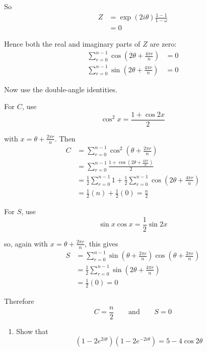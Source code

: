 \documentclass[leqno]{article}
\begin{document}
\begin{enumerate}[
  label=\textbf{\arabic*.},
  leftmargin=*,
  topsep=0pt,
  partopsep=0pt,
  parsep=0pt
]
\begin{djsSolution}
So
\begin{align*}
Z
&=\exp(2i\theta)\frac{1-1}{1-\omega} \\
&=0
\end{align*}

Hence both the real and imaginary parts of \(Z\) are zero:
\begin{align*}
\sum_{r=0}^{n-1}\cos\left(2\theta+\frac{4\pi r}{n}\right)&=0 \\
\sum_{r=0}^{n-1}\sin\left(2\theta+\frac{4\pi r}{n}\right)&=0
\end{align*}

Now use the double-angle identities.

For \(C\), use
\[
\cos^2 x=\frac{1+\cos 2x}{2}
\]

with \(x=\theta+\frac{2\pi r}{n}\). Then
\begin{align*}
C
&=\sum_{r=0}^{n-1}\cos^2\left(\theta+\frac{2\pi r}{n}\right) \\
&=\sum_{r=0}^{n-1}\frac{1+\cos\left(2\theta+\frac{4\pi r}{n}\right)}{2} \\
&=\frac12\sum_{r=0}^{n-1}1+\frac12\sum_{r=0}^{n-1}\cos\left(2\theta+\frac{4\pi r}{n}\right) \\
&=\frac12(n)+\frac12(0) =\frac{n}{2}
\end{align*}

For \(S\), use
\[
\sin x\cos x=\frac12\sin 2x
\]

so, again with \(x=\theta+\frac{2\pi r}{n}\), this gives
\begin{align*}
S
&=\sum_{r=0}^{n-1}\sin\left(\theta+\frac{2\pi r}{n}\right)\cos\left(\theta+\frac{2\pi r}{n}\right) \\
&=\frac12\sum_{r=0}^{n-1}\sin\left(2\theta+\frac{4\pi r}{n}\right) \\
&=\frac12(0) 
=0
\end{align*}

Therefore
\[
C=\frac{n}{2}
\qquad \text{and} \qquad
S=0
\]
\end{djsSolution}


\newpage

\questionitem

\begin{enumerate}[label=\textbf{(\roman*)}]
  \item Show that \[(1 - 2e^{2i\theta})(1 - 2e^{-2i\theta}) = 5 - 4\cos 2\theta\]  \\
\end{enumerate}


\end{enumerate}
\end{document}

